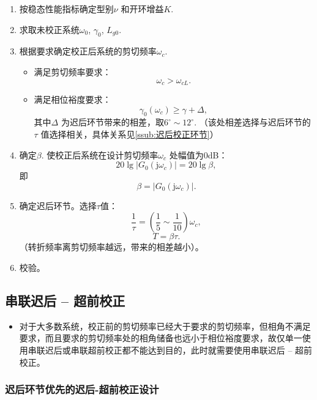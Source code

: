 \documentclass[14pt,a4paper]{article}
\theoremstyle{plain}
\theoremstyle{definition}
\theoremstyle{remark}
\theoremstyle{plain}
\theoremstyle{plain}
\theoremstyle{plain}
\theoremstyle{definition}
\theoremstyle{remark}
\numberwithin{equation}{section}
\begin{document}
				\begin{enumerate}
					\item 按稳态性能指标确定型别$\nu$ 和开环增益$K$. 
					\item 求取未校正系统$\omega_0$, $\gamma_0$, $L_{g 0}$. 
					\item 根据要求确定校正后系统的剪切频率$\omega_c$. 
						\begin{itemize}%
							\item 满足剪切频率要求：
								\[
								\omega_c > \omega_{cL}
								.\] 
							\item 满足相位裕度要求：
								\[
									\gamma_0(\omega_c) \ge \gamma + \Delta
								,\] 
								其中$\Delta $ 为迟后环节带来的相差，取$6^\circ \sim 12^\circ$. （该处相差选择与迟后环节的$\tau$ 值选择相关，具体关系见\ref{ssub:迟后校正环节}） 
						\end{itemize}  
					\item 确定$\beta $. 使校正后系统在设计剪切频率$\omega_c$ 处幅值为0dB：
						\[
							20\lg \left| G_0(\mathrm{j} \omega_c) \right| = 20\lg \beta  
						,\] 
						即 
						\[
						\beta = \left| G_0(\mathrm{j} \omega_c) \right|
						.\] 
					\item 确定迟后环节。选择$\tau$值： 
						\[
							\dfrac{1}{\tau} = \left( \dfrac{1}{5} \sim \dfrac{1}{10} \right) \omega_c	
						,\] 
						\[
						T = \beta \tau
						.\] 
						（转折频率离剪切频率越远，带来的相差越小）。 
					\item 校验。
				\end{enumerate} 


		\subsection{串联迟后 -- 超前校正}%
		\label{sub:串联迟后_超前校正}
		
			\begin{itemize}
				\item 对于大多数系统，校正前的剪切频率已经大于要求的剪切频率，但相角不满足要求，而且要求的剪切频率处的相角储备也远小于相位裕度要求，故仅单一使用串联迟后或串联超前校正都不能达到目的，此时就需要使用串联迟后 -- 超前校正。
			\end{itemize}  

			\subsubsection{迟后环节优先的迟后-超前校正设计}%
			\label{ssub:迟后环节优先的迟后_超前校正设计}
			
\end{document}
